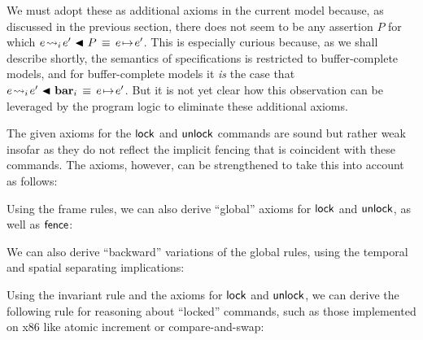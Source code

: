 \documentclass[11pt]{report}
\begin{document}
We must adopt these as additional axioms in the current model because, as discussed in the previous section, there does not seem to be any assertion $P$ for which $e \!\leadsto_{i}\! e' \operatorname{\,\blacktriangleleft\,} P \,\equiv\, e \!\mapsto\! e'$. This is especially curious because, as we shall describe shortly, the semantics of specifications is restricted to buffer-complete models, and for buffer-complete models it \emph{is} the case that $e \!\leadsto_{i}\! e' \operatorname{\,\blacktriangleleft\,} \mathbf{bar}_{i} \,\equiv\, e \!\mapsto\! e'$. But it is not yet clear how this observation can be leveraged by the program logic to eliminate these additional axioms. 

The given axioms for the $\operatorname{\mathsf{lock}}$ and $\operatorname{\mathsf{unlock}}$ commands are sound but rather weak insofar as they do not reflect the implicit fencing that is coincident with these commands. The axioms, however, can be strengthened to take this into account as follows: 

Using the frame rules, we can also derive ``global'' axioms for $\operatorname{\mathsf{lock}}$ and $\operatorname{\mathsf{unlock}}$, as well as $\operatorname{\mathsf{fence}}$: 
  

We can also derive ``backward'' variations of the global rules, using the temporal and spatial separating implications: 



Using the invariant rule and the axioms for $\operatorname{\mathsf{lock}}$ and $\operatorname{\mathsf{unlock}}$, we can derive the following rule for reasoning about ``locked'' commands, such as those implemented on x86 like atomic increment or compare-and-swap:  
\end{document}
